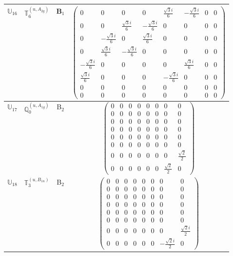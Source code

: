 \documentclass[fleqn,10pt,landscape]{article}
\begin{document}
\begin{itemize}
\begin{center}
\begin{longtable}{c|c|c|c}
$ \mathbb{U}_{16} $ & $\mathbb{T}_{6}^{(u,A_{2g})}$ & B$_{1}$ & $\begin{pmatrix} 0 & 0 & 0 & 0 & \frac{\sqrt{3} i}{6} & - \frac{\sqrt{3} i}{6} & 0 & 0 \\ 0 & 0 & \frac{\sqrt{3} i}{6} & - \frac{\sqrt{3} i}{6} & 0 & 0 & 0 & 0 \\ 0 & - \frac{\sqrt{3} i}{6} & 0 & \frac{\sqrt{3} i}{6} & 0 & 0 & 0 & 0 \\ 0 & \frac{\sqrt{3} i}{6} & - \frac{\sqrt{3} i}{6} & 0 & 0 & 0 & 0 & 0 \\ - \frac{\sqrt{3} i}{6} & 0 & 0 & 0 & 0 & \frac{\sqrt{3} i}{6} & 0 & 0 \\ \frac{\sqrt{3} i}{6} & 0 & 0 & 0 & - \frac{\sqrt{3} i}{6} & 0 & 0 & 0 \\ 0 & 0 & 0 & 0 & 0 & 0 & 0 & 0 \\ 0 & 0 & 0 & 0 & 0 & 0 & 0 & 0 \end{pmatrix}$ \\ \hline
$ \mathbb{U}_{17} $ & $\mathbb{Q}_{0}^{(u,A_{1g})}$ & B$_{2}$ & $\begin{pmatrix} 0 & 0 & 0 & 0 & 0 & 0 & 0 & 0 \\ 0 & 0 & 0 & 0 & 0 & 0 & 0 & 0 \\ 0 & 0 & 0 & 0 & 0 & 0 & 0 & 0 \\ 0 & 0 & 0 & 0 & 0 & 0 & 0 & 0 \\ 0 & 0 & 0 & 0 & 0 & 0 & 0 & 0 \\ 0 & 0 & 0 & 0 & 0 & 0 & 0 & 0 \\ 0 & 0 & 0 & 0 & 0 & 0 & 0 & \frac{\sqrt{2}}{2} \\ 0 & 0 & 0 & 0 & 0 & 0 & \frac{\sqrt{2}}{2} & 0 \end{pmatrix}$ \\
$ \mathbb{U}_{18} $ & $\mathbb{T}_{3}^{(u,B_{1u})}$ & B$_{2}$ & $\begin{pmatrix} 0 & 0 & 0 & 0 & 0 & 0 & 0 & 0 \\ 0 & 0 & 0 & 0 & 0 & 0 & 0 & 0 \\ 0 & 0 & 0 & 0 & 0 & 0 & 0 & 0 \\ 0 & 0 & 0 & 0 & 0 & 0 & 0 & 0 \\ 0 & 0 & 0 & 0 & 0 & 0 & 0 & 0 \\ 0 & 0 & 0 & 0 & 0 & 0 & 0 & 0 \\ 0 & 0 & 0 & 0 & 0 & 0 & 0 & \frac{\sqrt{2} i}{2} \\ 0 & 0 & 0 & 0 & 0 & 0 & - \frac{\sqrt{2} i}{2} & 0 \end{pmatrix}$ \\ \hline

\end{longtable}
\end{center}
\end{itemize}
\end{document}
